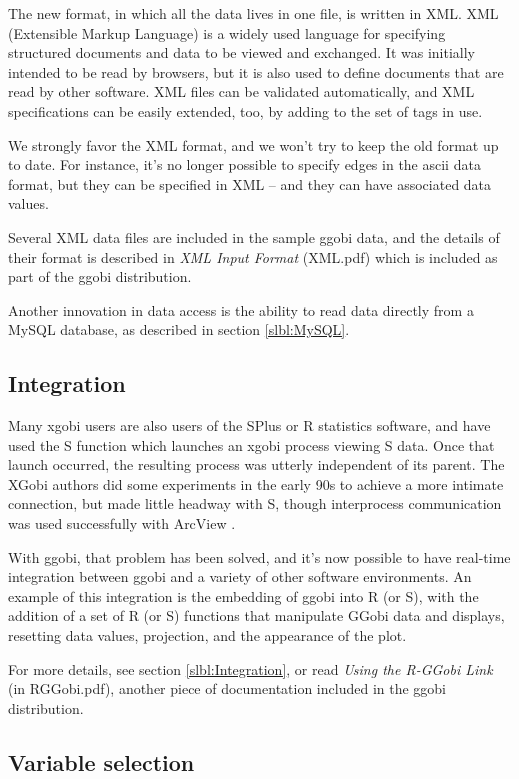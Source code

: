 \documentclass[11pt]{article}
\begin{document}
The new format, in which all the data lives in one file, is written
in XML.  XML (Extensible Markup Language) is a widely used language
for specifying structured documents and data to be viewed and
exchanged.  It was initially intended to be read by browsers, but it
is also used to define documents that are read by other software.
XML files can be validated automatically, and XML specifications can
be easily extended, too, by adding to the set of tags in use.

We strongly favor the XML format, and we won't try to keep the
old format up to date.  For instance, it's no longer possible
to specify edges in the ascii data format, but they can be specified in
XML -- and they can have associated data values.

Several XML data files are included in the sample ggobi data, and
the details of their format is described in {\em XML Input Format}
(XML.pdf) which is included as part of the ggobi distribution.

Another innovation in data access is the ability to read data
directly from a MySQL database, as described in section \ref{slbl:MySQL}.

\subsection{Integration}

Many xgobi users are also users of the SPlus or R statistics software, and
have used the S function which launches an xgobi process viewing S data.
Once that launch occurred, the resulting process was utterly independent
of its parent.  The XGobi authors did some experiments in the early 90s
to achieve a more intimate connection, but made little headway with S,
though interprocess communication was used successfully with ArcView
\cite{SwayneBujaHubbell91,SMCM97}.

With ggobi, that problem has been solved, and it's now possible
to have real-time integration between ggobi and a variety of
other software environments.  An example of this integration is
the embedding of ggobi into R (or S), with the addition of a set of
R (or S) functions that manipulate GGobi data and displays,
resetting data values, projection, and the appearance of the plot.

For more details, see section \ref{slbl:Integration}, or read
{\em Using the R-GGobi Link} (in RGGobi.pdf), another piece of
documentation included in the ggobi distribution.

\subsection {Variable selection}
\end{document}
